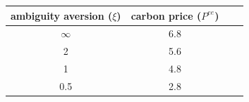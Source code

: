 \begin{tabular}{cccc}
\hline
 ambiguity aversion ($\xi$) &  carbon price ($P^{ee}$)\\
\hline
 $\infty$ & 6.8 \\
 2 & 5.6 \\
 1 & 4.8 \\
 0.5 & 2.8 \\
\hline
\end{tabular}
